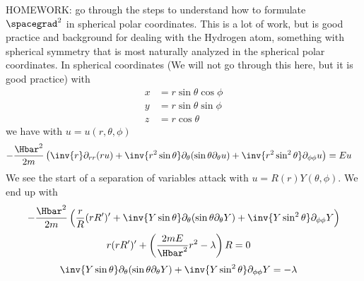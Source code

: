%
%
HOMEWORK: go through the steps to understand how to formulate \(\spacegrad^2\) in spherical polar coordinates.  This is a lot of work, but is good practice and background for dealing with the Hydrogen atom, something with spherical symmetry that is most naturally analyzed in the spherical polar coordinates.
%
In spherical coordinates (We will not go through this here, but it is good practice) with
%
\begin{equation}\label{eqn:lecture5BigReviewAngularMomentum:5020}
\begin{aligned}
x &= r \sin\theta \cos\phi \\
y &= r \sin\theta \sin\phi \\
z &= r \cos\theta
\end{aligned}
\end{equation}
%
we have with \(u = u(r,\theta, \phi)\)
%
\begin{equation}\label{eqn:lecture5BigReviewAngularMomentum:5040}
\begin{aligned}
-\frac{\Hbar^2}{2m} \left(
\inv{r} \partial_{rr} (r u) +  \inv{r^2 \sin\theta} \partial_\theta (\sin\theta \partial_\theta u)
+ \inv{r^2 \sin^2\theta} \partial_{\phi\phi} u
 \right)
&= E u
\end{aligned}
\end{equation}
%
We see the start of a separation of variables attack with \(u = R(r) Y(\theta, \phi)\).  We end up with
%
\begin{equation}\label{eqn:lecture5BigReviewAngularMomentum:5060}
\begin{aligned}
-\frac{\Hbar^2}{2m} &\left(
\frac{r}{R} (r R')' +  \inv{Y \sin\theta} \partial_\theta (\sin\theta \partial_\theta Y)
+ \inv{Y \sin^2\theta} \partial_{\phi\phi} Y
 \right) \\
\end{aligned}
\end{equation}
%
\begin{equation}\label{eqn:lecture5BigReviewAngularMomentum:5080}
\begin{aligned}
r (r R')' + \left( \frac{2m E}{\Hbar^2} r^2 - \lambda \right) R &= 0
\end{aligned}
\end{equation}
\begin{equation}\label{eqn:lecture5BigReviewAngularMomentum:5100}
\begin{aligned}
\inv{Y \sin\theta} \partial_\theta (\sin\theta \partial_\theta Y) + \inv{Y \sin^2\theta} \partial_{\phi\phi} Y &= -\lambda
\end{aligned}
\end{equation}
